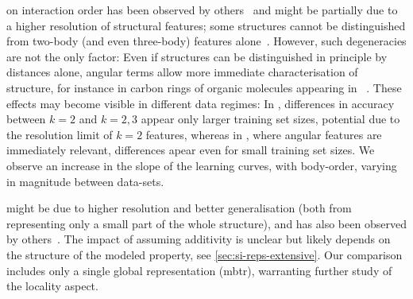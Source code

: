  on interaction order has been observed by others~\cite{ptm2018q,hjrf2020q,fchl2018q,wt2018q,s2018Cq}
and might be partially due to a higher resolution of structural features; some structures cannot be distinguished from two-body (and even three-body) features alone~\cite{pwcc2020q}.
However, such degeneracies are not the only factor: Even if structures can be distinguished in principle by distances alone, angular terms allow more immediate characterisation of structure, for instance in carbon rings of organic molecules appearing in \dsgdb~\cite{ptm2018q}.
These effects may become visible in different data regimes: In \dsba{}, differences in accuracy between $k{=}2$ and $k{=}2,3$ appear only larger training set sizes, potential due to the resolution limit of $k{=}2$ features, whereas in \dsgdb{}, where angular features are immediately relevant, differences apear even for small training set sizes.
We observe an increase in the slope of the learning curves, with body-order, varying in magnitude between data-sets.


 might be due to higher resolution and better generalisation 
(both from representing only a small part of the whole structure), and has also been observed by others~\cite{jmhf2018q,hxh2020q}.
The impact of assuming additivity is unclear but likely depends on the structure of the modeled property, see \cref{sec:si-reps-extensive}.
Our comparison includes only a single global representation (\gls{mbtr}), warranting further study of the locality aspect.

